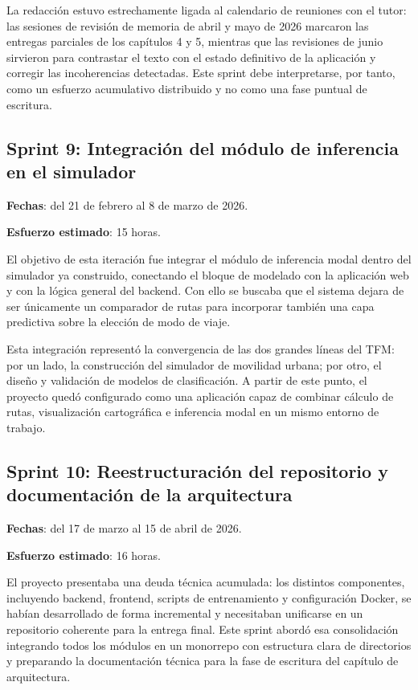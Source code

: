 La redacción estuvo estrechamente ligada al calendario de reuniones con el tutor: las sesiones de revisión de memoria de abril y mayo de 2026 marcaron las entregas parciales de los capítulos 4 y 5, mientras que las revisiones de junio sirvieron para contrastar el texto con el estado definitivo de la aplicación y corregir las incoherencias detectadas. Este sprint debe interpretarse, por tanto, como un esfuerzo acumulativo distribuido y no como una fase puntual de escritura.

\subsection{Sprint 9: Integración del módulo de inferencia en el simulador}

\textbf{Fechas}: del 21 de febrero al 8 de marzo de 2026.

\textbf{Esfuerzo estimado}: 15 horas.\newline

El objetivo de esta iteración fue integrar el módulo de inferencia modal dentro del simulador ya construido, conectando el bloque de modelado con la aplicación web y con la lógica general del backend. Con ello se buscaba que el sistema dejara de ser únicamente un comparador de rutas para incorporar también una capa predictiva sobre la elección de modo de viaje.\newline

Esta integración representó la convergencia de las dos grandes líneas del TFM: por un lado, la construcción del simulador de movilidad urbana; por otro, el diseño y validación de modelos de clasificación. A partir de este punto, el proyecto quedó configurado como una aplicación capaz de combinar cálculo de rutas, visualización cartográfica e inferencia modal en un mismo entorno de trabajo.

\subsection{Sprint 10: Reestructuración del repositorio y documentación de la arquitectura}

\textbf{Fechas}: del 17 de marzo al 15 de abril de 2026.

\textbf{Esfuerzo estimado}: 16 horas.\newline

El proyecto presentaba una deuda técnica acumulada: los distintos componentes, incluyendo backend, frontend, scripts de entrenamiento y configuración Docker, se habían desarrollado de forma incremental y necesitaban unificarse en un repositorio coherente para la entrega final. Este sprint abordó esa consolidación integrando todos los módulos en un monorrepo con estructura clara de directorios y preparando la documentación técnica para la fase de escritura del capítulo de arquitectura.\newline

